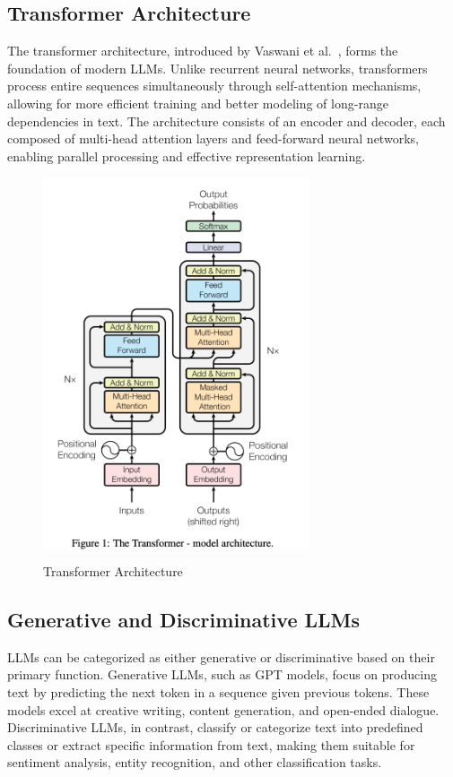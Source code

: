 \subsection{Transformer Architecture}
The transformer architecture, introduced by Vaswani et 
al.~\cite{vaswani2023attentionneed}, forms the foundation of modern 
LLMs. Unlike recurrent neural networks, transformers process entire 
sequences simultaneously through self-attention mechanisms, allowing for 
more efficient training and better modeling of long-range dependencies in 
text. The architecture consists of an encoder and decoder, each composed 
of multi-head attention layers and feed-forward neural networks, enabling 
parallel processing and effective representation learning.
\begin{figure}[htbp]
    \centering
    \includegraphics[width=0.7\textwidth]{figures/transformer_arch.png}
    \caption{Transformer Architecture}
    \label{fig:transformer_arch}
\end{figure}
\subsection{Generative and Discriminative LLMs}
LLMs can be categorized as either generative or discriminative based on
their primary function. Generative LLMs, such as GPT models, focus on 
producing text by predicting the next token in a sequence given previous 
tokens. These models excel at creative writing, content generation, and
open-ended dialogue. Discriminative LLMs, in contrast, classify or 
categorize text into predefined classes or extract specific information 
from text, making them suitable for sentiment analysis, entity recognition,
and other classification tasks.
